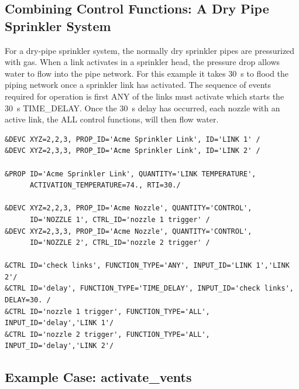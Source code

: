\documentclass[11pt]{book}
\begin{document}
\subsection{Combining Control Functions: A Dry Pipe Sprinkler System}
\label{info:dry_pipe}

For a dry-pipe sprinkler system, the normally
dry sprinkler pipes are pressurized with gas.  When a link activates in a sprinkler head, the pressure drop allows
water to flow into the pipe network.  For this example it takes 30~s to flood the piping network once a sprinkler link
has activated.  The sequence of events required for operation is first {\ct ANY} of the links must activate which
starts the 30~s {\ct TIME\_DELAY}.  Once the 30~s delay has occurred, each nozzle with an active link, the {\ct ALL}
control functions, will then flow water.

\begin{lstlisting}
&DEVC XYZ=2,2,3, PROP_ID='Acme Sprinkler Link', ID='LINK 1' /
&DEVC XYZ=2,3,3, PROP_ID='Acme Sprinkler Link', ID='LINK 2' /

&PROP ID='Acme Sprinkler Link', QUANTITY='LINK TEMPERATURE',
      ACTIVATION_TEMPERATURE=74., RTI=30./

&DEVC XYZ=2,2,3, PROP_ID='Acme Nozzle', QUANTITY='CONTROL',
      ID='NOZZLE 1', CTRL_ID='nozzle 1 trigger' /
&DEVC XYZ=2,3,3, PROP_ID='Acme Nozzle', QUANTITY='CONTROL',
      ID='NOZZLE 2', CTRL_ID='nozzle 2 trigger' /

&CTRL ID='check links', FUNCTION_TYPE='ANY', INPUT_ID='LINK 1','LINK 2'/
&CTRL ID='delay', FUNCTION_TYPE='TIME_DELAY', INPUT_ID='check links', DELAY=30. /
&CTRL ID='nozzle 1 trigger', FUNCTION_TYPE='ALL', INPUT_ID='delay','LINK 1'/
&CTRL ID='nozzle 2 trigger', FUNCTION_TYPE='ALL', INPUT_ID='delay','LINK 2'/
\end{lstlisting}


\subsection{Example Case: activate\_vents}
\end{document}
